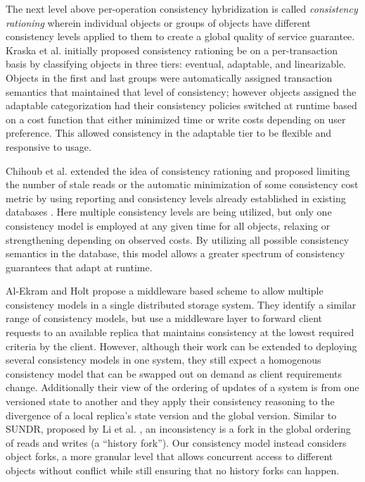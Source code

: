 \documentclass[10pt,conference,letterpaper]{IEEEtran}
\begin{document}
The next level above per-operation consistency hybridization is called \textit{consistency rationing} wherein individual objects or groups of objects have different consistency levels applied to them to create a global quality of service guarantee. Kraska et al. \cite{kraska_consistency_2009} initially proposed consistency rationing be on a per-transaction basis by classifying objects in three tiers: eventual, adaptable, and linearizable. Objects in the first and last groups were automatically assigned transaction semantics that maintained that level of consistency; however objects assigned the adaptable categorization had their consistency policies switched at runtime based on a cost function that either minimized time or write costs depending on user preference. This allowed consistency in the adaptable tier to be flexible and responsive to usage.

Chihoub et al. extended the idea of consistency rationing and proposed limiting the number of stale reads or the automatic minimization of some consistency cost metric by using reporting and consistency levels already established in existing databases \cite{chihoub_harmony:_2012,chihoub_consistency_2013}. Here multiple consistency levels are being utilized, but only one consistency model is employed at any given time for all objects, relaxing or strengthening depending on observed costs. By utilizing all possible consistency semantics in the database, this model allows a greater spectrum of consistency guarantees that adapt at runtime.

Al-Ekram and Holt \cite{al-ekram_multi-consistency_2010} propose a middleware based scheme to allow multiple consistency models in a single distributed storage system. They identify a similar range of consistency models, but use a middleware layer to forward client requests to an available replica that maintains consistency at the lowest required criteria by the client. However, although their work can be extended to deploying several consistency models in one system, they still expect a homogenous consistency model that can be swapped out on demand as client requirements change. Additionally their view of the ordering of updates of a system is from one versioned state to another and they apply their consistency reasoning to the divergence of a local replica's state version and the global version. Similar to SUNDR, proposed by Li et al. \cite{li_secure_2004}, an inconsistency is a fork in the global ordering of reads and writes (a ``history fork''). Our consistency model instead considers object forks, a more granular level that allows concurrent access to different objects without conflict while still ensuring that no history forks can happen.
\end{document}
